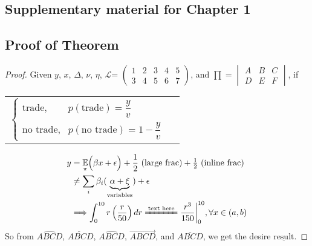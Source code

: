 \documentclass[letterpaper]{report}
\newcommand{\E}{\mathbb{E}}
\begin{document}
\begin{appendices}
  \doublespacing
  
  \chapter{Supplementary material for  Chapter 1}
  
  \section{Proof of Theorem}
  
  \begin{proof} 
    
    Given $y$, $x$, $\Delta$, $\nu$, $\eta$, $\mathcal{L}$=
    $\begin{pmatrix}
    1 & 2 & 3 & 4 & 5 \\
    3 & 4 & 5 & 6 & 7
    \end{pmatrix}$,
    and $\prod=\begin{vmatrix}
    A &B  &C \\
    D&  E& F
    \end{vmatrix}$, if
    
    \begin{center}
      \begin{tabular}{ll}
        $\begin{cases}
        \text{trade}, & p(\text{trade})=\dfrac{y}{v}\\
        \text{no trade}, & p(\text{no trade})=1-\dfrac{y}{v}
        \end{cases}$
      \end{tabular}
    \end{center}
    
    \vspace*{-1.2cm}
    
    \begin{align}\label{myEquation}
      \nonumber y&=\underset{\pi}{\E}\Big(\beta x + \epsilon\Big) + \dfrac{1}{2}\text{ (large frac)} + \tfrac{1}{2} \text{ (inline frac)}\\
      \nonumber &\neq\sum\limits_{i}\beta_i(\underbrace{\alpha+\xi}_{\text{variables}}) + \epsilon\\
      &\Longrightarrow \int_{0}^{10}r \left( \dfrac{r}{50} \right)dr\xlongequal{\text{text here}}\dfrac{r^{3}}{150}\biggr\rvert^{10}_{0}, \forall x\in (a,b)
    \end{align}
    So from $\widehat{ABCD}$, $\widetilde{ABCD}$, $\widehat{ABCD}$, $\overrightarrow{ABCD}$, and $\overline{ABCD}$, we get the desire $\underline{\text{result}}$.
  \end{proof}
  

\end{appendices}
\end{document}
